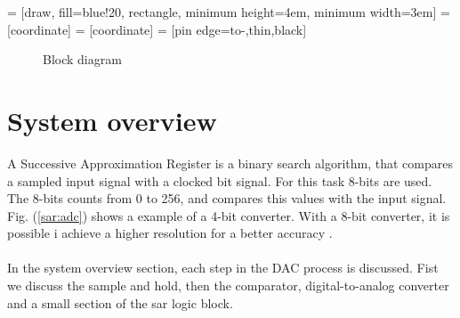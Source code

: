 \documentclass[english, 12pt, a4paper]{ifimaster}
\begin{document}
 = [draw, fill=blue!20, rectangle, 
    minimum height=4em, minimum width=3em]
 = [coordinate]
 = [coordinate]
 = [pin edge={to-,thin,black}]
\begin{figure}[!ht]
  \caption{Block diagram}
  \label{block_diagram}
\end{figure}
\section{System overview}
A Successive Approximation Register is a binary search algorithm, that compares a sampled input signal with a clocked bit signal. For this task 8-bits are used. The 8-bits counts from 0 to 256, and 
compares this values with the input signal. Fig. (\ref{sar:adc}) shows a example of a 4-bit converter. With a 8-bit converter, it is possible i achieve a higher resolution for a better accuracy \cite{sar-adc-concept}.\\
\\
In the system overview section, each step in the DAC process is discussed. Fist we discuss the sample and hold, then the comparator, digital-to-analog converter and a small section of 
the sar logic block. 
\end{document}
